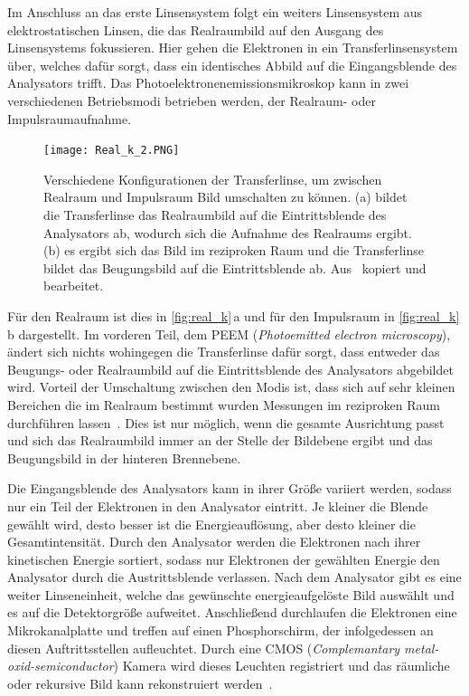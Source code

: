         Im Anschluss an das erste Linsensystem folgt ein weiters Linsensystem aus elektrostatischen Linsen, die das Realraumbild auf den Ausgang des Linsensystems fokussieren.
        Hier gehen die Elektronen in ein Transferlinsensystem über, welches dafür sorgt, dass ein identisches Abbild auf die Eingangsblende des Analysators trifft.
        Das Photoelektronenemissionsmikroskop kann in zwei verschiedenen Betriebsmodi betrieben werden, der Realraum- oder Impulsraumaufnahme.
        \begin{figure}
            \centering
            \texttt{[image: Real\_k\_2.PNG]}
            \caption{Verschiedene Konfigurationen der Transferlinse, um zwischen Realraum und Impulsraum Bild umschalten zu können.
            (a) bildet die Transferlinse das Realraumbild auf die Eintrittsblende des Analysators ab, wodurch sich die Aufnahme des Realraums ergibt.
            (b) es ergibt sich das Bild im reziproken Raum und die Transferlinse bildet das Beugungsbild auf die Eintrittsblende ab.
            Aus~\cite{Focus} kopiert und bearbeitet.}
            \label{fig:real_k}
        \end{figure}
        Für den Realraum ist dies in \autoref{fig:real_k}\,a und für den Impulsraum in \autoref{fig:real_k}\,b dargestellt.
        Im vorderen Teil, dem PEEM (\textit{Photoemitted electron microscopy}), ändert sich nichts wohingegen die Transferlinse dafür sorgt, dass entweder das Beugungs- oder Realraumbild auf die Eintrittsblende des Analysators abgebildet wird.
        Vorteil der Umschaltung zwischen den Modis ist, dass sich auf sehr kleinen Bereichen die im Realraum bestimmt wurden Messungen im reziproken Raum durchführen lassen~\cite{suga_photoelectron_2021}.
        Dies ist nur möglich, wenn die gesamte Ausrichtung passt und sich das Realraumbild immer an der Stelle der Bildebene ergibt und das Beugungsbild in der hinteren Brennebene.

        Die Eingangsblende des Analysators kann in ihrer Größe variiert werden, sodass nur ein Teil der Elektronen in den Analysator eintritt.
        Je kleiner die Blende gewählt wird, desto besser ist die Energieauflösung, aber desto kleiner die Gesamtintensität.
        Durch den Analysator werden die Elektronen nach ihrer kinetischen Energie sortiert, sodass nur Elektronen der gewählten Energie den Analysator durch die Austrittsblende verlassen.
        Nach dem Analysator gibt es eine weiter Linseneinheit, welche das gewünschte energieaufgelöste Bild auswählt und es auf die Detektorgröße aufweitet.
        Anschließend durchlaufen die Elektronen eine Mikrokanalplatte und treffen auf einen Phosphorschirm, der infolgedessen an diesen Auftrittsstellen aufleuchtet.
        Durch eine CMOS (\textit{Complemantary metal-oxid-semiconductor}) Kamera wird dieses Leuchten registriert und das räumliche oder rekursive Bild kann rekonstruiert werden~\cite{SPECS-MM}. 

